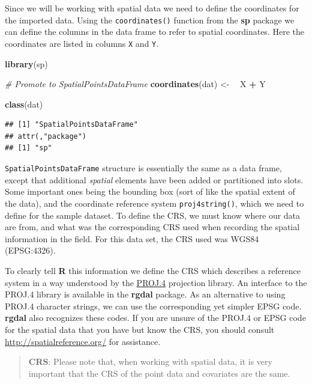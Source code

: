 \documentclass[10pt,b5paper,]{book}
\newenvironment{Shaded}{\begin{snugshade}}{\end{snugshade}}
\newcommand{\CommentTok}[1]{\textcolor[rgb]{0.56,0.35,0.01}{\textit{#1}}}
\newcommand{\ErrorTok}[1]{\textcolor[rgb]{0.64,0.00,0.00}{\textbf{#1}}}
\newcommand{\KeywordTok}[1]{\textcolor[rgb]{0.13,0.29,0.53}{\textbf{#1}}}
\newcommand{\NormalTok}[1]{#1}
\newcommand{\OperatorTok}[1]{\textcolor[rgb]{0.81,0.36,0.00}{\textbf{#1}}}
\newcommand{\StringTok}[1]{\textcolor[rgb]{0.31,0.60,0.02}{#1}}
\theoremstyle{definition}
\theoremstyle{definition}
\theoremstyle{definition}
\theoremstyle{remark}
\begin{document}
Since we will be working with spatial data we need to define the
coordinates for the imported data. Using the \texttt{coordinates()}
function from the \textbf{sp}  package we can
define the columns in the data frame to refer to spatial coordinates.
Here the coordinates are listed in columns \texttt{X} and \texttt{Y}.

\begin{Shaded}
\begin{Highlighting}[]
\KeywordTok{library}\NormalTok{(sp)}

\CommentTok{# Promote to SpatialPointsDataFrame}
\KeywordTok{coordinates}\NormalTok{(dat) <-}\StringTok{ }\ErrorTok{~}\StringTok{ }\NormalTok{X }\OperatorTok{+}\StringTok{ }\NormalTok{Y}

\KeywordTok{class}\NormalTok{(dat)}
\end{Highlighting}
\end{Shaded}

\begin{verbatim}
## [1] "SpatialPointsDataFrame"
## attr(,"package")
## [1] "sp"
\end{verbatim}

\texttt{SpatialPointsDataFrame} structure is essentially the same as a
data frame, except that additional \emph{spatial} elements have been
added or partitioned into slots. Some important ones being the bounding
box (sort of like the spatial extent of the data), and the coordinate
reference system \texttt{proj4string()}, which we need to define for the
sample dataset. To define the CRS, we must know where our data are from,
and what was the corresponding CRS used when recording the spatial
information in the field. For this data set, the CRS used was WGS84
(EPSG:4326).

To clearly tell \textbf{R} this information we define the CRS which
describes a reference system in a way understood by the
\href{http://trac.osgeo.org/proj/}{PROJ.4} projection library. An
interface to the PROJ.4 library is available in the \textbf{rgdal}
package. As an alternative to using PROJ.4 character strings, we can use
the corresponding yet simpler EPSG code. \textbf{rgdal} also recognizes
these codes. If you are unsure of the PROJ.4 or EPSG code for the
spatial data that you have but know the CRS, you should consult
\url{http://spatialreference.org/} for assistance.

\begin{quote}
\textbf{CRS}: Please note that, when working with spatial data, it is
very important that the CRS of the point data and covariates are the
same.
\end{quote}
\end{document}

